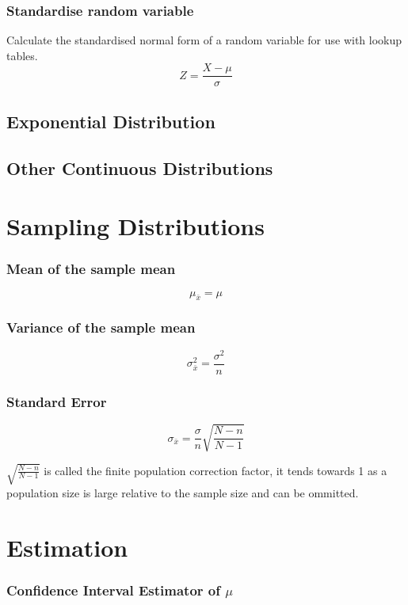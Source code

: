\documentclass{article}
\begin{document}
\subsubsection{Standardise random variable}
Calculate the standardised normal form of a random variable for use with lookup tables.
$$
Z = \frac{X - \mu}{\sigma}
$$

\subsection{Exponential Distribution}

\subsection{Other Continuous Distributions}




\section{Sampling Distributions}

\subsubsection{Mean of the sample mean}

$$
\mu_{\bar{x}}=\mu
$$

\subsubsection{Variance of the sample mean}

$$
\sigma^2_{\bar{x}} = \frac{\sigma^2}{n}
$$

\subsubsection{Standard Error}

$$
\sigma_{\bar{x}} = \frac{\sigma}{n} \sqrt{\frac{N - n}{N - 1}}
$$

$ \sqrt{\frac{N - n}{N - 1}} $ is called the finite population correction factor, it tends towards 1 as a population size is large relative to the sample size and can be ommitted.




\section{Estimation}

\subsubsection{Confidence Interval Estimator of $\mu$}
\end{document}
